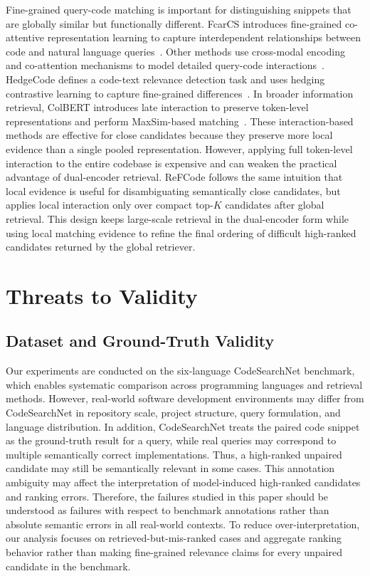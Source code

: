 \documentclass[10pt,conference]{IEEEtran}
\newcommand{\method}{ReFCode}
\begin{document}
Fine-grained query-code matching is important for distinguishing snippets that are globally similar but functionally different. 
FcarCS introduces fine-grained co-attentive representation learning to capture interdependent relationships between code and natural language queries~\cite{FcarCS}. 
Other methods use cross-modal encoding and co-attention mechanisms to model detailed query-code interactions~\cite{FineGrainedCS}. 
HedgeCode defines a code-text relevance detection task and uses hedging contrastive learning to capture fine-grained differences~\cite{HedgeCode}. 
In broader information retrieval, ColBERT introduces late interaction to preserve token-level representations and perform MaxSim-based matching~\cite{ColBERT}. 
These interaction-based methods are effective for close candidates because they preserve more local evidence than a single pooled representation. 
However, applying full token-level interaction to the entire codebase is expensive and can weaken the practical advantage of dual-encoder retrieval. 
\method{} follows the same intuition that local evidence is useful for disambiguating semantically close candidates, but applies local interaction only over compact top-\(K\) candidates after global retrieval. 
This design keeps large-scale retrieval in the dual-encoder form while using local matching evidence to refine the final ordering of difficult high-ranked candidates returned by the global retriever.

\section{Threats to Validity}

\subsection{Dataset and Ground-Truth Validity}

Our experiments are conducted on the six-language CodeSearchNet benchmark, which enables systematic comparison across programming languages and retrieval methods. 
However, real-world software development environments may differ from CodeSearchNet in repository scale, project structure, query formulation, and language distribution. 
In addition, CodeSearchNet treats the paired code snippet as the ground-truth result for a query, while real queries may correspond to multiple semantically correct implementations. 
Thus, a high-ranked unpaired candidate may still be semantically relevant in some cases. 
This annotation ambiguity may affect the interpretation of model-induced high-ranked candidates and ranking errors. 
Therefore, the failures studied in this paper should be understood as failures with respect to benchmark annotations rather than absolute semantic errors in all real-world contexts. 
To reduce over-interpretation, our analysis focuses on retrieved-but-mis-ranked cases and aggregate ranking behavior rather than making fine-grained relevance claims for every unpaired candidate in the benchmark.
\end{document}
